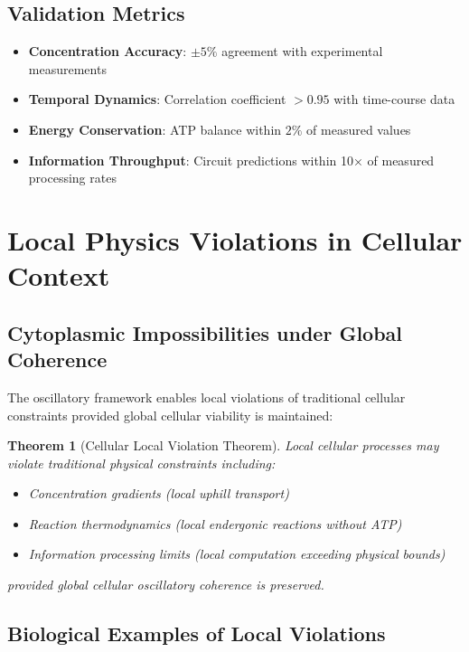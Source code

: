 \documentclass[12pt,a4paper]{article}
\newtheorem{theorem}{Theorem}
\begin{document}
\subsection{Validation Metrics}

\begin{itemize}
\item \textbf{Concentration Accuracy}: $\pm 5\%$ agreement with experimental measurements
\item \textbf{Temporal Dynamics}: Correlation coefficient $> 0.95$ with time-course data
\item \textbf{Energy Conservation}: ATP balance within $2\%$ of measured values
\item \textbf{Information Throughput}: Circuit predictions within 10× of measured processing rates
\end{itemize}

\section{Local Physics Violations in Cellular Context}

\subsection{Cytoplasmic Impossibilities under Global Coherence}

The oscillatory framework enables local violations of traditional cellular constraints provided global cellular viability is maintained:

\begin{theorem}[Cellular Local Violation Theorem]
Local cellular processes may violate traditional physical constraints including:
\begin{itemize}
\item Concentration gradients (local uphill transport)
\item Reaction thermodynamics (local endergonic reactions without ATP)
\item Information processing limits (local computation exceeding physical bounds)
\end{itemize}
provided global cellular oscillatory coherence is preserved.
\end{theorem}

\subsection{Biological Examples of Local Violations}
\end{document}
